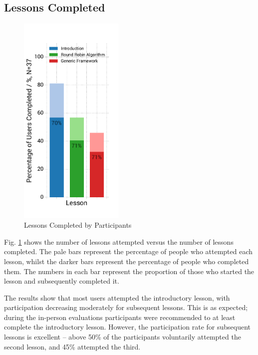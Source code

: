 \documentclass[bsc,twoside,singlespacing,parskip,logo,notimes,normalheadings]{infthesis}
\begin{document}
    \subsection{Lessons Completed}

    \begin{figure}
      \centering
      \vspace{-18mm}
      \includegraphics[width=5cm, trim=15 35 35 45, clip]{img/lessons.pdf}
      \captionsetup{width=5cm, justification=centering}
      \caption{Lessons Completed by Participants}\label{fig:lessons-complete}
    \end{figure}

    Fig. \ref{fig:lessons-complete} shows the number of lessons
    attempted versus the number of lessons completed. The pale bars
    represent the percentage of people who attempted each lesson,
    whilst the darker bars represent the percentage of people who
    completed them. The numbers in each bar represent the proportion
    of those who started the lesson and subsequently completed it.

    The results show that most users attempted the introductory
    lesson, with participation decreasing moderately for subsequent
    lessons. This is as expected; during the in-person evaluations
    participants were recommended to at least complete the
    introductory lesson. However, the participation rate for
    subsequent lessons is excellent -- above 50\% of the participants
    voluntarily attempted the second lesson, and 45\% attempted the
    third.
\end{document}
